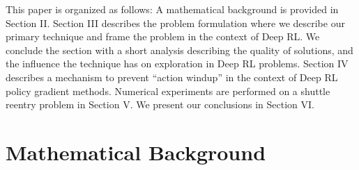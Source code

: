 \documentclass{UnderReview}
\begin{document}
This paper is organized as follows: A mathematical background is provided in Section II.  Section III describes the problem formulation where we describe our primary technique and frame the problem in the context of Deep RL.  We conclude the section with a short analysis describing the quality of solutions, and the influence the technique has on exploration in Deep RL problems.  Section IV describes a mechanism to prevent ``action windup'' in the context of Deep RL policy gradient methods.  Numerical experiments are performed on a shuttle reentry problem in Section V.  We present our conclusions in Section VI.  


\section{Mathematical Background}
\end{document}
